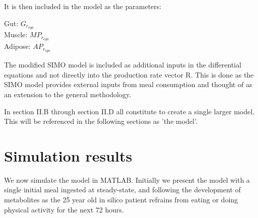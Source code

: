 \documentclass{IEEEtran}
\begin{document}
It is then included in the model as the parameters:
\begin{center}
    Gut: $G_{r_{oga}}$ \\
    Muscle: $MP_{r_{oga}}$ \\
    Adipose: $AP_{r_{oga}}$
\end{center}

The modified SIMO model is included as additional inputs in the differential equations and not directly into the production rate vector R. This is done as the SIMO model provides external inputs from meal consumption and thought of as an extension to the general methodology.









In section II.B through section II.D all constitute to create a single larger model. This will be referenced in the following sections as 'the model'.


\section{Simulation results}
\label{sec:simulationresults}

We now simulate the model in MATLAB. Initially we present the model with a single initial meal ingested at steady-state, and following the development of metabolites as the 25 year old in silico patient refrains from eating or doing physical activity for the next 72 hours. \\




\end{document}

